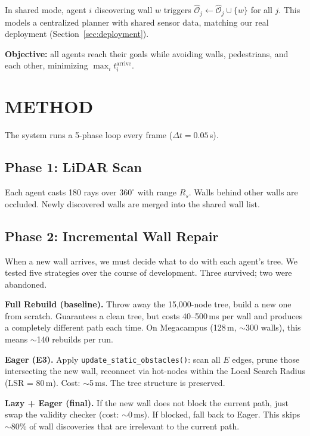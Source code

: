 \documentclass[letterpaper, 10pt, conference]{IEEEtran}
\newcommand{\degree}{^\circ}
\begin{document}
In shared mode, agent $i$ discovering wall $w$ triggers $\hat{\mathcal{O}}_j \leftarrow \hat{\mathcal{O}}_j \cup \{w\}$ for all $j$. This models a centralized planner with shared sensor data, matching our real deployment (Section~\ref{sec:deployment}).

\textbf{Objective:} all agents reach their goals while avoiding walls, pedestrians, and each other, minimizing $\max_i t_i^{\text{arrive}}$.

\section{METHOD}

The system runs a 5-phase loop every frame ($\Delta t {=} 0.05$\,s).

\subsection{Phase 1: LiDAR Scan}

Each agent casts 180 rays over $360\degree$ with range $R_s$. Walls behind other walls are occluded. Newly discovered walls are merged into the shared wall list.

\subsection{Phase 2: Incremental Wall Repair}

When a new wall arrives, we must decide what to do with each agent's tree. We tested five strategies over the course of development. Three survived; two were abandoned.

\textbf{Full Rebuild (baseline).} Throw away the 15{,}000-node tree, build a new one from scratch. Guarantees a clean tree, but costs 40--500\,ms per wall and produces a completely different path each time. On Megacampus (128\,m, ${\sim}$300 walls), this means ${\sim}$140 rebuilds per run.

\textbf{Eager (E3).} Apply \texttt{update\_static\_obstacles()}: scan all $E$ edges, prune those intersecting the new wall, reconnect via hot-nodes within the Local Search Radius (LSR = 80\,m). Cost: ${\sim}$5\,ms. The tree structure is preserved.

\textbf{Lazy + Eager (final).} If the new wall does not block the current path, just swap the validity checker (cost: ${\sim}$0\,ms). If blocked, fall back to Eager. This skips ${\sim}$80\% of wall discoveries that are irrelevant to the current path.
\end{document}
